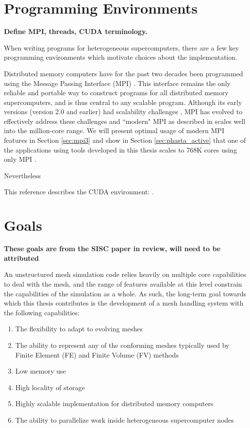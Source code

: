 \section{Programming Environments}

{\bf Define MPI, threads, CUDA terminology.}

When writing programs for heterogeneous supercomputers,
there are a few key programming environments which motivate
choices about the implementation.

Distributed memory computers have for the past two decades
been programmed using the Message Passing Interface (MPI)
\cite{hempel1994mpi,walker1996mpi}.
This interface remains the only reliable and portable way to construct
programs for all distributed memory supercomputers,
and is thus central to any scalable program.
Although its early versions (version 2.0 and earlier) had
scalability challenges \cite{balaji2009mpi}, MPI has evolved
to effectively address these challenges and ``modern" MPI
as described in \cite{gropp2014using} scales well into the
million-core range.
We will present optimal usage of modern MPI features in
Section \ref{sec:mpi3} and show in Section \ref{sec:phasta_active}
that one of the applications using tools developed
in this thesis scales to 768K cores using only MPI \cite{rasquinCise2014}.

Nevertheless

This reference describes the CUDA environment: \cite{nickolls2008scalable}.

\section{Goals}
\label{sec:intro_goals}

{\bf These goals are from the SISC paper in review, will
need to be attributed}

An unstructured mesh simulation code relies heavily on
multiple core capabilities to deal with the mesh,
and the range of features available at this level constrain
the capabilities of the simulation as a whole.
As such, the long-term goal towards which this thesis
contributes is the development of a mesh handling system
with the following capabilities:

\begin{enumerate}
\item The flexibility to adapt to evolving meshes
\item The ability to represent any of the conforming meshes typically
used by Finite Element (FE) and Finite Volume (FV) methods
\item Low memory use
\item High locality of storage
\item Highly scalable implementation for distributed memory computers
\item The ability to parallelize work inside heterogeneous
supercomputer nodes
\end{enumerate}

